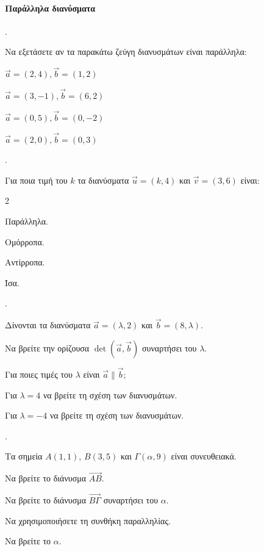 \documentclass[11pt,a4paper,twocolumn]{article}
\newcounter{askhsh}
\newcommand{\askhsh}{\large\theaskhsh.\ \addtocounter{askhsh}{1}}
\begin{document}
\paragraph{Παράλληλα διανύσματα}
\askhsh Να εξετάσετε αν τα παρακάτω ζεύγη διανυσμάτων είναι παράλληλα:

\begin{alist}
    \item $\vec{a}=(2, 4), \vec{b}=(1, 2)$
    \item $\vec{a}=(3, -1), \vec{b}=(6, 2)$
    \item $\vec{a}=(0, 5), \vec{b}=(0, -2)$
    \item $\vec{a}=(2, 0), \vec{b}=(0, 3)$
\end{alist}


\askhsh Για ποια τιμή του $k$ τα διανύσματα $\vec{u}=(k, 4)$ και $\vec{v}=(3, 6)$ είναι:
\begin{multicols}{2}
\begin{alist}
    \item Παράλληλα.
    \item Ομόρροπα.
    \item Αντίρροπα.
    \item Ίσα.
\end{alist}
\end{multicols}

\askhsh Δίνονται τα διανύσματα $\vec{a}=(\lambda, 2)$ και $\vec{b}=(8, \lambda)$.

\begin{alist}
    \item Να βρείτε την ορίζουσα $\det(\vec{a}, \vec{b})$ συναρτήσει του $\lambda$.
    \item Για ποιες τιμές του $\lambda$ είναι $\vec{a}\parallel\vec{b}$;
    \item Για $\lambda=4$ να βρείτε τη σχέση των διανυσμάτων.
    \item Για $\lambda=-4$ να βρείτε τη σχέση των διανυσμάτων.
\end{alist}


\askhsh Τα σημεία $A(1, 1)$, $B(3, 5)$ και $\Gamma(\alpha, 9)$ είναι συνευθειακά.

\begin{alist}
    \item Να βρείτε το διάνυσμα $\vec{AB}$.
    \item Να βρείτε το διάνυσμα $\vec{B\Gamma}$ συναρτήσει του $\alpha$.
    \item Να χρησιμοποιήσετε τη συνθήκη παραλληλίας.
    \item Να βρείτε το $\alpha$.
\end{alist}
\end{document}

